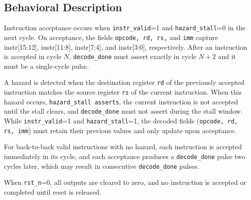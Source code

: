 \documentclass{article}
\begin{document}
\subsection{Behavioral Description}
Instruction acceptance occurs when \texttt{instr\_valid}=1 and \texttt{hazard\_stall}=0 in the next cycle. On acceptance, the fields \texttt{opcode, rd, rs,} and \texttt{imm} capture instr[15:12], instr[11:8], instr[7:4], and instr[3:0], respectively. After an instruction is accepted in cycle $N$, \texttt{decode\_done} must assert exactly in cycle $N+2$ and it must be a single-cycle pulse.

A hazard is detected when the destination register \texttt{rd} of the previously accepted instruction matches the source register \texttt{rs} of the current instruction. When this hazard occurs, \texttt{hazard\_stall asserts}, the current instruction is not accepted until the stall clears, and \texttt{decode\_done} must not assert during the stall window. While \texttt{instr\_valid}=1 and \texttt{hazard\_stall}=1, the decoded fields (\texttt{opcode, rd, rs, imm}) must retain their previous values and only update upon acceptance.

For back-to-back valid instructions with no hazard, each instruction is accepted immediately in its cycle, and each acceptance produces a \texttt{decode\_done} pulse two cycles later, which may result in consecutive \texttt{decode\_done} pulses.

When \texttt{rst\_n}=0, all outputs are cleared to zero, and no instruction is accepted or completed until reset is released.




\end{document}
